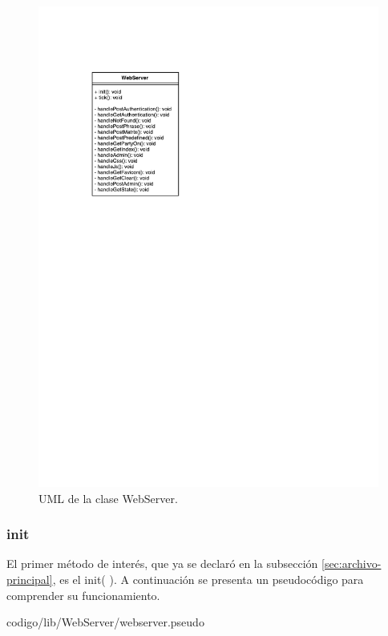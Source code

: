     \begin{figure}[ht!]
        \centering
        \begin{center}
            \includegraphics[scale=1]{imagenes/WebServer.pdf}
            \caption{UML de la clase WebServer.}
            \label{fig:uml-webserver}
        \end{center}
    \end{figure}


        \subsubsection{init}
        El primer método de interés, que ya se declaró en la subsección \ref{sec:archivo-principal}, es el init( ). A continuación se presenta un pseudocódigo para comprender su funcionamiento.
    
        
                             {codigo/lib/WebServer/webserver.pseudo}
    
